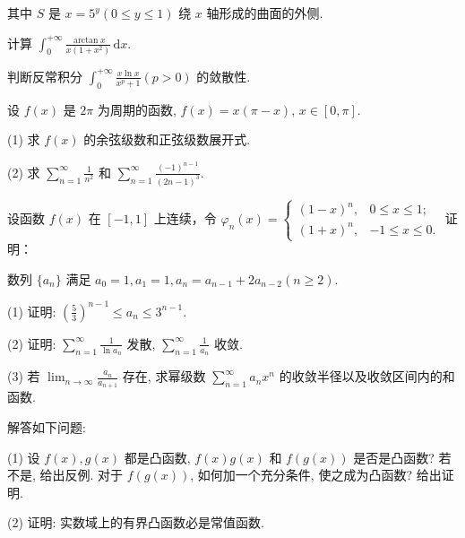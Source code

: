 其中 $S$ 是 $x = 5^{y}$$(0\leq y\leq 1)$ 绕 $x$ 轴形成的曲面的外侧.\par
计算 $\int_0^{+\infty} \frac{\arctan x}{x(1 + x^2)} \, \mathrm{d}x$.\par
判断反常积分 $\int_0^{+\infty} \frac{x \ln x}{x^p + 1} (p > 0)$ 的敛散性.\par
设 $f(x)$ 是 $2\pi$ 为周期的函数, $f(x) = x(\pi - x)$, $x \in [0, \pi]$.\par
(1) 求 $f(x)$ 的余弦级数和正弦级数展开式.\par
(2) 求 $\sum_{n=1}^{\infty} \frac{1}{n^2}$ 和 $\sum_{n=1}^{\infty} \frac{(-1)^{n-1}}{(2n-1)^3}$.\par
\par{}
设函数 $f(x)$ 在 $[-1, 1]$ 上连续，令 $\varphi_n(x) = \begin{cases} (1 - x)^n, & 0 \leq x \leq 1; \\ (1 + x)^n, & -1 \leq x \leq 0. \end{cases}$ 证明：\par
\nopagebreak[4]
数列 $\{a_{n}\}$ 满足 $a_0 = 1, a_1 = 1, a_n = a_{n-1} + 2a_{n-2} (n \geq 2)$.\par
(1) 证明: $\left(\frac{5}{3}\right)^{n-1} \leq a_n \leq 3^{n-1}$.\par
(2) 证明: $\sum_{n=1}^{\infty} \frac{1}{\ln a_n}$ 发散, $\sum_{n=1}^{\infty} \frac{1}{a_n}$ 收敛.\par
(3) 若 $\lim_{n\to \infty}\frac{a_n}{a_{n + 1}}$ 存在, 求幂级数 $\sum_{n = 1}^{\infty}a_nx^n$ 的收敛半径以及收敛区间内的和函数.\par
解答如下问题:\par
(1) 设 $f(x), g(x)$ 都是凸函数, $f(x)g(x)$ 和 $f(g(x))$ 是否是凸函数? 若不是, 给出反例. 对于 $f(g(x))$, 如何加一个充分条件, 使之成为凸函数? 给出证明.\par
(2) 证明: 实数域上的有界凸函数必是常值函数.\par
